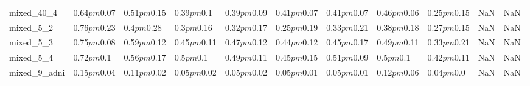 \begin{tabular}{lllllllllll}
mixed_40_4 & 0.64$pm$0.07 & 0.51$pm$0.15 & 0.39$pm$0.1 & 0.39$pm$0.09 & 0.41$pm$0.07 & 0.41$pm$0.07 & 0.46$pm$0.06 & 0.25$pm$0.15 & NaN & NaN \\
mixed_5_2 & 0.76$pm$0.23 & 0.4$pm$0.28 & 0.3$pm$0.16 & 0.32$pm$0.17 & 0.25$pm$0.19 & 0.33$pm$0.21 & 0.38$pm$0.18 & 0.27$pm$0.15 & NaN & NaN \\
mixed_5_3 & 0.75$pm$0.08 & 0.59$pm$0.12 & 0.45$pm$0.11 & 0.47$pm$0.12 & 0.44$pm$0.12 & 0.45$pm$0.17 & 0.49$pm$0.11 & 0.33$pm$0.21 & NaN & NaN \\
mixed_5_4 & 0.72$pm$0.1 & 0.56$pm$0.17 & 0.5$pm$0.1 & 0.49$pm$0.11 & 0.45$pm$0.15 & 0.51$pm$0.09 & 0.5$pm$0.1 & 0.42$pm$0.11 & NaN & NaN \\
mixed_9_adni & 0.15$pm$0.04 & 0.11$pm$0.02 & 0.05$pm$0.02 & 0.05$pm$0.02 & 0.05$pm$0.01 & 0.05$pm$0.01 & 0.12$pm$0.06 & 0.04$pm$0.0 & NaN & NaN \\
\bottomrule
\end{tabular}
